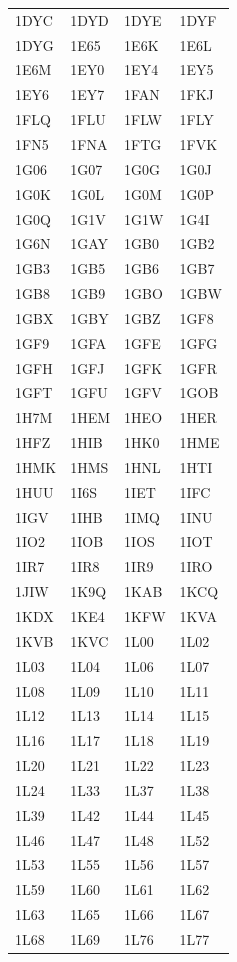 \begin{longtable}{p{} p{} p{} p{}}
1DYC & 1DYD & 1DYE & 1DYF \\
1DYG & 1E65 & 1E6K & 1E6L \\
1E6M & 1EY0 & 1EY4 & 1EY5 \\
1EY6 & 1EY7 & 1FAN & 1FKJ \\
1FLQ & 1FLU & 1FLW & 1FLY \\
1FN5 & 1FNA & 1FTG & 1FVK \\
1G06 & 1G07 & 1G0G & 1G0J \\
1G0K & 1G0L & 1G0M & 1G0P \\
1G0Q & 1G1V & 1G1W & 1G4I \\
1G6N & 1GAY & 1GB0 & 1GB2 \\
1GB3 & 1GB5 & 1GB6 & 1GB7 \\
1GB8 & 1GB9 & 1GBO & 1GBW \\
1GBX & 1GBY & 1GBZ & 1GF8 \\
1GF9 & 1GFA & 1GFE & 1GFG \\
1GFH & 1GFJ & 1GFK & 1GFR \\
1GFT & 1GFU & 1GFV & 1GOB \\
1H7M & 1HEM & 1HEO & 1HER \\
1HFZ & 1HIB & 1HK0 & 1HME \\
1HMK & 1HMS & 1HNL & 1HTI \\
1HUU & 1I6S & 1IET & 1IFC \\
1IGV & 1IHB & 1IMQ & 1INU \\
1IO2 & 1IOB & 1IOS & 1IOT \\
1IR7 & 1IR8 & 1IR9 & 1IRO \\
1JIW & 1K9Q & 1KAB & 1KCQ \\
1KDX & 1KE4 & 1KFW & 1KVA \\
1KVB & 1KVC & 1L00 & 1L02 \\
1L03 & 1L04 & 1L06 & 1L07 \\
1L08 & 1L09 & 1L10 & 1L11 \\
1L12 & 1L13 & 1L14 & 1L15 \\
1L16 & 1L17 & 1L18 & 1L19 \\
1L20 & 1L21 & 1L22 & 1L23 \\
1L24 & 1L33 & 1L37 & 1L38 \\
1L39 & 1L42 & 1L44 & 1L45 \\
1L46 & 1L47 & 1L48 & 1L52 \\
1L53 & 1L55 & 1L56 & 1L57 \\
1L59 & 1L60 & 1L61 & 1L62 \\
1L63 & 1L65 & 1L66 & 1L67 \\
1L68 & 1L69 & 1L76 & 1L77 \\

\end{longtable}
